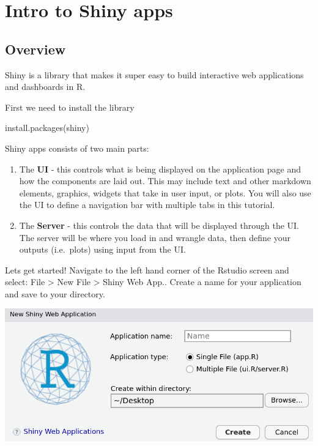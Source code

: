 \documentclass[
]{book}
\newenvironment{Shaded}{\begin{snugshade}}{\end{snugshade}}
\newcommand{\FunctionTok}[1]{\textcolor[rgb]{0.00,0.00,0.00}{#1}}
\newcommand{\NormalTok}[1]{#1}
\newcommand{\StringTok}[1]{\textcolor[rgb]{0.31,0.60,0.02}{#1}}
\begin{document}
\hypertarget{intro-to-shiny-apps}{%
\chapter{Intro to Shiny apps}\label{intro-to-shiny-apps}}

\hypertarget{overview}{%
\section{Overview}\label{overview}}

Shiny is a library that makes it super easy to build interactive web applications and dashboards in R.

First we need to install the library

\begin{Shaded}
\begin{Highlighting}[]
\FunctionTok{install.packages}\NormalTok{(}\StringTok{\textquotesingle{}shiny\textquotesingle{}}\NormalTok{)}
\end{Highlighting}
\end{Shaded}

Shiny apps consists of two main parts:

\begin{enumerate}
\def\labelenumi{\arabic{enumi})}
\item
  The \textbf{UI} - this controls what is being displayed on the application page and how the components are laid out. This may include text and other markdown elements, graphics, widgets that take in user input, or plots. You will also use the UI to define a navigation bar with multiple tabs in this tutorial.
\item
  The \textbf{Server} - this controls the data that will be displayed through the UI. The server will be where you load in and wrangle data, then define your outputs (i.e.~plots) using input from the UI.
\end{enumerate}

Lets get started! Navigate to the left hand corner of the Rstudio screen and select: File \textgreater{} New File \textgreater{} Shiny Web App.. Create a name for your application and save to your directory.

\includegraphics{img/new_shiny_app.png}
\end{document}
